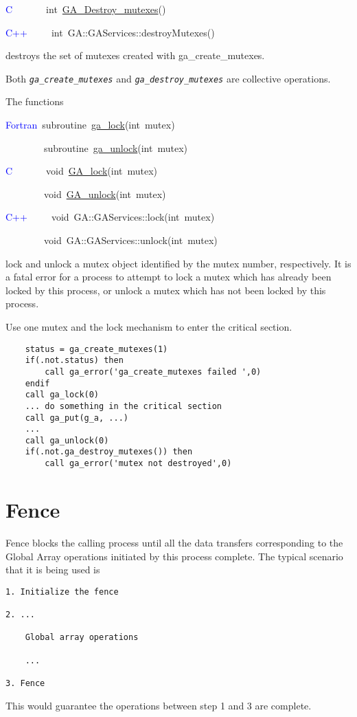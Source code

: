 \textcolor{blue}{C}~~~~~~~int~\href{https://hpc.pnl.gov/globalarrays/api/c_op_api.html#DESTROY_MUTEXES}{GA\_{}Destroy\_{}mutexes}()

\textcolor{blue}{C++}~~~~~int~GA::GAServices::destroyMutexes()

destroys the set of mutexes created with ga\_create\_mutexes.

Both \texttt{\emph{ga\_create\_mutexes}} and \texttt{\emph{ga\_destroy\_mutexes}}
are collective operations.

The functions

\textcolor{blue}{Fortran}~subroutine~\href{https://hpc.pnl.gov/globalarrays/api/f_op_api.html\#LOCK}{ga\_{}lock}(int~mutex)~

~~~~~~~~subroutine~\href{https://hpc.pnl.gov/globalarrays/api/f_op_api.html#UNLOCK}{ga\_{}unlock}(int~mutex)~

\textcolor{blue}{C}~~~~~~~void~\href{https://hpc.pnl.gov/globalarrays/api/c_op_api.html#LOCK}{GA\_{}lock}(int~mutex)~

~~~~~~~~void~\href{https://hpc.pnl.gov/globalarrays/api/c_op_api.html#UNLOCK}{GA\_{}unlock}(int~mutex)~

\textcolor{blue}{C++}~~~~~void~GA::GAServices::lock(int~mutex)~

~~~~~~~~void~GA::GAServices::unlock(int~mutex)

lock and unlock a mutex object identified by the mutex number, respectively.
It is a fatal error for a process to attempt to lock a mutex which
has already been locked by this process, or unlock a mutex which has
not been locked by this process.

\emph{}\underbar{ }\emph{}\underbar{:}

Use one mutex and the lock mechanism to enter the critical section.
\begin{verbatim}
    status = ga_create_mutexes(1)
    if(.not.status) then
        call ga_error('ga_create_mutexes failed ',0)
    endif
    call ga_lock(0)
    ... do something in the critical section
    call ga_put(g_a, ...)
    ...
    call ga_unlock(0)
    if(.not.ga_destroy_mutexes()) then
        call ga_error('mutex not destroyed',0)
\end{verbatim}

\section{Fence }

Fence blocks the calling process until all the data transfers corresponding
to the Global Array operations initiated by this process complete.
The typical scenario that it is being used is
\begin{verbatim}
1. Initialize the fence

2. ...

    Global array operations

    ...

3. Fence
\end{verbatim}
This would guarantee the operations between step 1 and 3 are complete.

